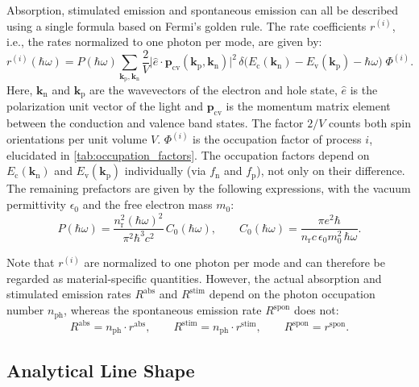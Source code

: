 Absorption, stimulated emission and spontaneous emission can all be described
using a single formula based on Fermi's golden rule. The rate coefficients $r^{(i)}$,
i.e., the rates normalized to one photon per mode, are given by:
\begin{equation}
	r^{(i)}(\hbar\omega)=P(\hbar\omega)\sum_{\mathbf{k}_{\mathrm{p}},\mathbf{k}_{\mathrm{n}}}
	\frac{2}{V}\lvert\hat e\cdot\mathbf{p}_{\mathrm{cv}}(\mathbf{k}_{\mathrm{p}},\mathbf{k}
	_{\mathrm{n}})\rvert^{2}\,\delta\big(E_{\mathrm{c}}(\mathbf{k}_{\mathrm{n}})-E_{\mathrm{v}}
	(\mathbf{k}_{\mathrm{p}})-\hbar\omega\big)\;\Phi^{(i)}.\label{eq:universal_rate_equation}
\end{equation}
Here, $\mathbf{k}_{\mathrm{n}}$ and $\mathbf{k}_{\mathrm{p}}$ are the wavevectors of the
electron and hole state, $\hat e$ is the polarization unit vector of the light and
$\mathbf{p}_{\mathrm{cv}}$ is the momentum matrix element between the conduction and
valence band states. The factor $2/V$ counts
both spin orientations per unit volume $V$. $\Phi^{(i)}$ is the
occupation factor of process $i$, elucidated in \cref{tab:occupation_factors}. The
occupation factors depend on $E_{\mathrm{c}}(\mathbf{k}_{\mathrm{n}})$ and $E_{\mathrm{v}}
(\mathbf{k}_{\mathrm{p}})$ individually (via $f_{\mathrm{n}}$ and
$f_{\mathrm{p}}$), not only on their difference. The remaining prefactors are given
by the following expressions, with the vacuum permittivity $\epsilon_{0}$ and the free
electron mass $m_{0}$:
\begin{equation}
	P(\hbar\omega)=\frac{n_{\mathrm{r}}^{2}(\hbar\omega)^{2}}{\pi^{2}\hbar^{3}c^{2}}
	\,C_{0}(\hbar\omega),\qquad C_{0}(\hbar\omega)=\frac{\pi e^{2}\hbar}{n_{\mathrm{r}}c\,\epsilon_{0}m_{0}^{2}\,\hbar\omega}.
\end{equation}

Note that $r^{(i)}$ are normalized to one photon per mode and can therefore be regarded
as material-specific quantities. However, the actual absorption and stimulated emission
rates $R^{\mathrm{abs}}$ and $R^{\mathrm{stim}}$ depend on the photon occupation number
$n_{\mathrm{ph}}$, whereas the spontaneous emission rate $R^{\mathrm{spon}}$ does not:
\begin{equation}
	R^{\mathrm{abs}}= n_{\mathrm{ph}}\cdot r^{\mathrm{abs}}, \qquad R^{\mathrm{stim}}
	= n_{\mathrm{ph}}\cdot r^{\mathrm{stim}}, \qquad R^{\mathrm{spon}}=r^{\mathrm{spon}}
	.
\end{equation}

\subsection{Analytical Line Shape}
\label{sec:line_shape}

